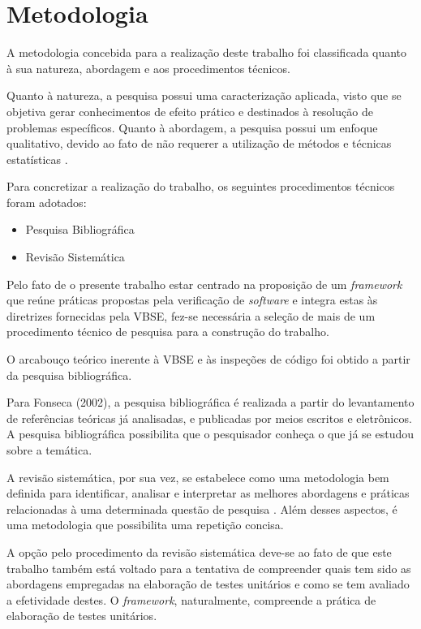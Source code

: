 \chapter{Metodologia}

A metodologia concebida para a realização deste trabalho foi classificada quanto à sua natureza, abordagem e aos procedimentos técnicos.

Quanto à natureza, a pesquisa possui uma caracterização aplicada, visto que se objetiva gerar conhecimentos de efeito prático e destinados à resolução de problemas específicos. Quanto à abordagem, a pesquisa possui um enfoque qualitativo, devido ao fato de não requerer a utilização de métodos e técnicas estatísticas \cite{metodologia}.

Para concretizar a realização do trabalho, os seguintes procedimentos técnicos foram adotados:

\begin{itemize}
	\item Pesquisa Bibliográfica
	\item Revisão Sistemática
\end{itemize}

Pelo fato de o presente trabalho estar centrado na proposição de um \textit{framework} que reúne práticas propostas pela verificação de \textit{software} e integra estas às diretrizes fornecidas pela VBSE, fez-se necessária a seleção de mais de um procedimento técnico de pesquisa para a construção do trabalho.
 
O arcabouço teórico inerente à VBSE e às inspeções de código foi obtido a partir da pesquisa bibliográfica.

Para Fonseca (2002), a pesquisa bibliográfica é realizada a partir do levantamento de referências teóricas já analisadas, e publicadas por meios escritos e eletrônicos. A pesquisa bibliográfica possibilita que o pesquisador conheça o que já se estudou sobre a temática.

A revisão sistemática, por sua vez, se estabelece como uma metodologia bem definida para identificar, analisar e interpretar as melhores abordagens e práticas relacionadas à uma determinada questão de pesquisa \cite{sistematica}. Além desses aspectos, é uma metodologia que possibilita uma repetição concisa.

A opção pelo procedimento da revisão sistemática deve-se ao fato de que este trabalho também está voltado para a tentativa de compreender quais tem sido as abordagens empregadas na elaboração de testes unitários e como se tem avaliado a efetividade destes. O \textit{framework}, naturalmente, compreende a prática de elaboração de testes unitários.

